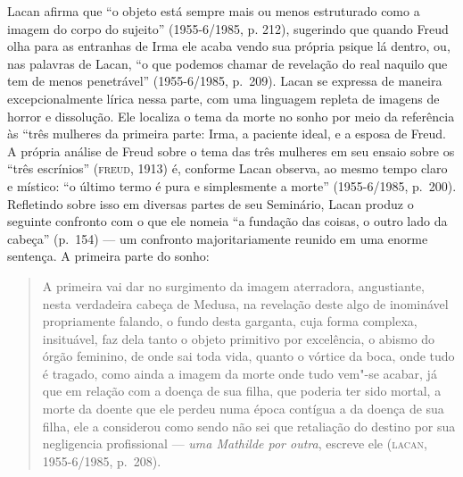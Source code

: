 Lacan afirma que ``o objeto está sempre mais ou menos estruturado como a
imagem do corpo do sujeito'' (1955-6/1985, p. 212), sugerindo que quando
Freud olha para as entranhas de Irma ele acaba vendo sua própria psique
lá dentro, ou, nas palavras de Lacan, ``o que podemos
chamar de revelação do real naquilo que tem de menos penetrável'' (1955-6/1985, p.~209).
Lacan se expressa de maneira excepcionalmente lírica nessa parte,
com uma linguagem repleta de imagens de horror e dissolução. Ele
localiza o tema da morte no sonho por meio da referência às ``três
mulheres da primeira parte: Irma, a paciente ideal, e a esposa de Freud.
A própria análise de Freud sobre o tema das três mulheres em seu ensaio
sobre os ``três escrínios'' (\textsc{freud}, 1913) é, conforme Lacan observa, ao
mesmo tempo claro e místico: ``o último termo é pura e simplesmente a
morte'' (1955-6/1985, p.~200). Refletindo sobre isso em diversas
partes de seu Seminário, Lacan produz o seguinte confronto com o que ele
nomeia ``a fundação das coisas, o outro lado da cabeça'' (p.~154) --- um
confronto majoritariamente reunido em uma enorme sentença. A primeira
parte do sonho:

\begin{quote}
A primeira vai dar no surgimento da imagem aterradora, angustiante,
nesta verdadeira cabeça de Medusa, na revelação deste algo de inominável
propriamente falando, o fundo desta garganta, cuja forma complexa,
insituável, faz dela tanto o objeto primitivo por excelência, o abismo
do órgão feminino, de onde sai toda vida, quanto o vórtice da boca, onde
tudo é tragado, como ainda a imagem da morte onde tudo vem"-se acabar, já
que em relação com a doença de sua filha, que poderia ter sido mortal, a
morte da doente que ele perdeu numa época contígua a da doença de sua
filha, ele a considerou como sendo não sei que retaliação do destino por
sua negligencia profissional --- \emph{uma Mathilde por outra}, escreve
ele (\textsc{lacan}, 1955-6/1985, p.~208).
\end{quote}

